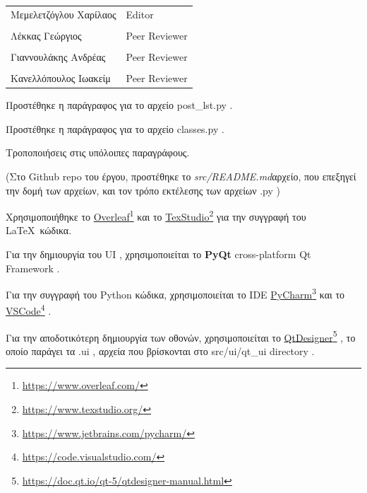 \documentclass{../ol-softwaremanual}
\newcommand{\doclink}[2]{\href{#1}{#2}\footnote{\url{#1}}}
\begin{document}
	
	\vspace{20pt}
	
	\begin{table}[htbp!]
		\begin{tabular}{ll}
			Μεμελετζόγλου Χαρίλαος & \en Editor \\
			\\ Λέκκας Γεώργιος      &   \en  Peer Reviewer \\
			\\ Γιαννουλάκης Ανδρέας & \en Peer Reviewer \\
			\\ Κανελλόπουλος Ιωακείμ & \en Peer Reviewer \\ 
		\end{tabular}
	\end{table}

	\vspace{10pt}
	\vspace{10pt}
	\flushleft
	
	Προστέθηκε η παράγραφος για το αρχείο \en post\_lst.py \gr . \break
	
	Προστέθηκε η παράγραφος για το αρχείο \en classes.py \gr . \break
	
	Τροποποιήσεις στις υπόλοιπες παραγράφους.	\break
	
	(Στο \en Github repo \gr του έργου, προστέθηκε το \en\textit{src/README.md}\gr αρχείο, που επεξηγεί την δομή των αρχείων, και τον τρόπο εκτέλεσης των αρχείων \en .py \gr)
	
	\newpage
	
	
	\vspace{20pt}
	\flushleft
	Χρησιμοποιήθηκε το \en \doclink{https://www.overleaf.com/}{Overleaf} \gr και το \en \doclink{https://www.texstudio.org/}{TexStudio} \gr για την συγγραφή του \LaTeX\ κώδικα. \break
	
	Για την δημιουργία του \en UI \gr, χρησιμοποιείται το \en \textbf{PyQt} cross-platform Qt Framework \gr. \break
	
	Για την συγγραφή του \en Python \gr κώδικα, χρησιμοποιείται το \en IDE \doclink{https://www.jetbrains.com/pycharm/}{PyCharm} \gr και το \en \doclink{https://code.visualstudio.com/}{VSCode} \gr .  \break 
	
	Για την αποδοτικότερη δημιουργία των οθονών, χρησιμοποιείται το \en \doclink{https://doc.qt.io/qt-5/qtdesigner-manual.html}{QtDesigner} \gr, το οποίο παράγει τα \en .ui \gr, αρχεία που βρίσκονται στο \en src/ui/qt\_ui directory \gr . \break
	
\end{document}
